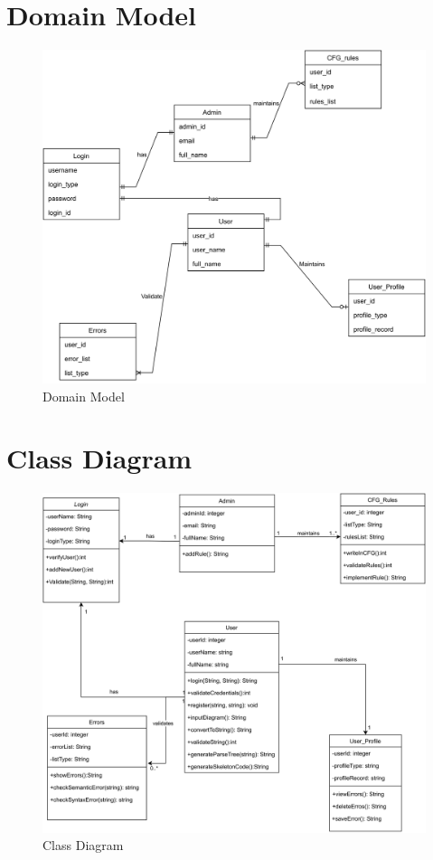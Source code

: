 \documentclass[12pt,a4paper]{article}
\begin{document}
\newpage
\section{Domain Model}
\begin{figure}[h]
  \centering
\includegraphics[width=\textwidth]{Diagram/Domain_Model.png}
\caption{Domain Model}
 \end{figure}
\newpage
\section{Class Diagram}
\begin{figure}[h]
 \centering
\includegraphics[scale=0.85]{Diagram/Class_Diagram.png}
\caption{Class Diagram}
\end{figure}
\end{document}
